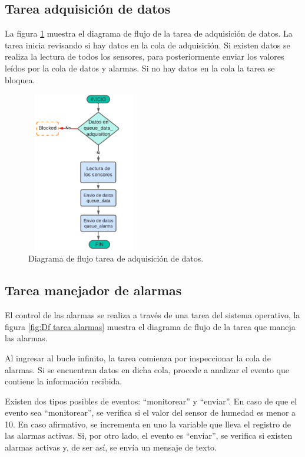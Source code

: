 \subsection{Tarea adquisición de datos} 
La figura \ref{fig:Df tarea adquisicion} muestra el diagrama de flujo de la tarea de adquisición de datos. La tarea inicia revisando si hay datos en la cola de adquisición. Si existen datos se realiza la lectura de todos los sensores, para posteriormente enviar los  valores leídos por la cola de datos y alarmas. Si no hay datos en la cola la tarea se bloquea. 

\begin{figure}[h]
  \centering
	\includegraphics[width=5cm, height=7cm]{./Figures/DF task adquisicion.png}
	\caption{Diagrama de flujo tarea de adquisición de datos.}
	\label{fig:Df tarea adquisicion}
\end{figure}

\vspace{5cm}
\subsection{Tarea manejador de alarmas} 
El control de las alarmas se realiza a través de una tarea del sistema operativo, la figura \ref{fig:Df tarea alarmas} muestra el diagrama de flujo de la tarea que maneja las alarmas.

Al ingresar al bucle infinito, la tarea comienza por inspeccionar la cola de alarmas. Si se encuentran datos en dicha cola, procede a analizar el evento que contiene la información recibida.

Existen dos tipos posibles de eventos: ``monitorear'' y  ``enviar''. En caso de que el evento sea ``monitorear'', se verifica si el valor del sensor de humedad es menor a 10. En caso afirmativo, se incrementa en uno la variable que lleva el registro de las alarmas activas. Si, por otro lado, el evento es ``enviar'', se verifica si existen alarmas activas y, de ser así, se envía un mensaje de texto.

